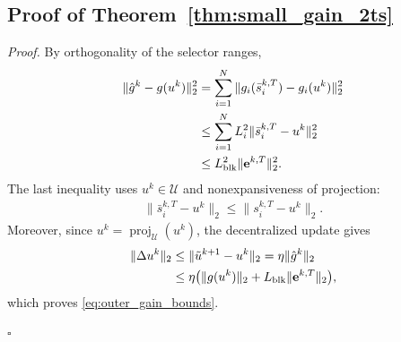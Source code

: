 \documentclass[letterpaper, 10 pt, conference]{ieeeconf} %
\newenvironment{proof}[1][Proof]{\par\noindent\textit{#1. }\ignorespaces}
  {\hfill$\square$\par}
\DeclareMathOperator{\proj}{proj}
\begin{document}
\subsection{Proof of Theorem~\ref{thm:small_gain_2ts}}
\begin{proof}
By orthogonality of the selector ranges,
\begin{align}
\|\hat g^{k}-g(u^{k})\|_2^2
&=
\sum_{i=1}^N
\|g_i(\bar s_i^{k,T})-g_i(u^{k})\|_2^2
\notag\\
&\le
\sum_{i=1}^N
L_i^2\|\bar s_i^{k,T}-u^{k}\|_2^2
\notag\\
&\le
L_{\mathrm{blk}}^2\|\mathbf e^{k,T}\|_2^2.
\end{align}
The last inequality uses \(u^k\in\mathcal U\) and nonexpansiveness of projection:
\begin{align}
\|\bar s_i^{k,T}-u^k\|_2
\le
\|s_i^{k,T}-u^k\|_2.
\end{align}
Moreover, since \(u^k=\proj_{\mathcal U}(u^k)\), the decentralized update gives
\begin{align}
\|\Delta u^k\|_2
&\le
\|\tilde u^{k+1}-u^k\|_2
=
\eta\|\hat g^k\|_2
\notag\\
&\le
\eta\bigl(\|g(u^k)\|_2
+L_{\mathrm{blk}}\|\mathbf e^{k,T}\|_2\bigr),
\end{align}
which proves \eqref{eq:outer_gain_bounds}.


\end{proof}
\end{document}
